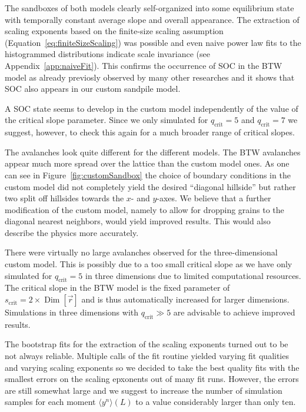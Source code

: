 The sandboxes of both models clearly self-organized into some equilibrium state with temporally constant average slope
and overall appearance. The extraction of scaling exponents based on the finite-size scaling assumption
(Equation~\eqref{eq:finiteSizeScaling}) was possible and even naive power law fits to the histogrammed distributions
indicate scale invariance (see Appendix~\ref{app:naiveFit}).
This confirms the occurrence of SOC in the BTW model as already previosly observed by many other researches
and it shows that SOC also appears in our custom sandpile model.

A SOC state seems to develop in the custom model independently of the value of the critical slope parameter.
Since we only simulated for $q_{\mathrm{crit}}=5$ and $q_{\mathrm{crit}}=7$ we suggest, however, to check this
again for a much broader range of critical slopes.

The avalanches look quite different for the different models. The BTW avalanches appear much more spread over the
lattice than the custom model ones. As one can see in Figure~\ref{fig:customSandbox} the choice of boundary conditions
in the custom model did not completely yield the desired \enquote{diagonal hillside} but rather two split off hillsides
towards the $x$- and $y$-axes. We believe that a further modification of the custom model, namely to allow for dropping
grains to the diagonal nearest neighbors, would yield improved results.
This would also describe the physics more accurately.

There were virtually no large avalanches observed for the three-dimensional custom model. This is possibly due to a
too small critical slope as we have only simulated for $q_{\mathrm{crit}}=5$ in three dimensions due to limited
computational resources.
The critical slope in the BTW model is the fixed parameter of $s_{\mathrm{crit}}=2\times\operatorname{Dim}
\left[\vec{r}\right]$ and is thus automatically increased for larger dimensions.
Simulations in three dimensions with $q_{\mathrm{crit}}\gg 5$ are advisable to achieve improved results.

The bootstrap fits for the extraction of the scaling exponents turned out to be not always reliable. Multiple calls
of the fit routine yielded varying fit qualities and varying scaling exponents so we decided to take the best quality
fits with the smallest errors on the scaling epxonents out of many fit runs. However, the errors are still somewhat
large and we suggest to increase the number of simulation samples for each moment $\langle y^n\rangle(L)$ to a value
considerably larger than only ten.

